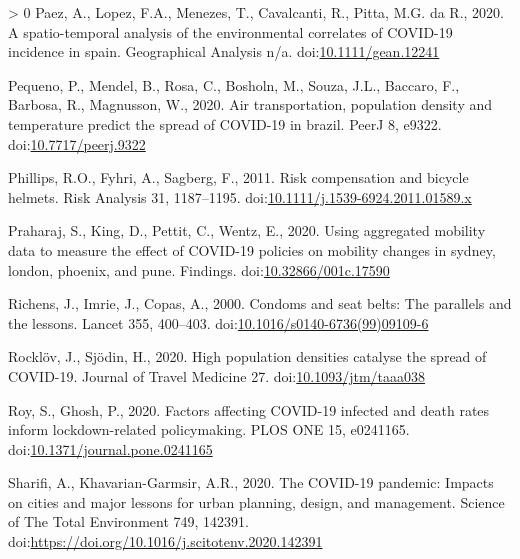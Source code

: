 \documentclass[]{elsarticle} %
\newlength{\cslhangindent}
\newenvironment{CSLReferences}[3] %
 {%
  \setlength{\parindent}{0pt}
  \ifodd #1 \everypar{\setlength{\hangindent}{\cslhangindent}}\ignorespaces\fi
  \ifnum #2 > 0
  \setlength{\parskip}{#2\baselineskip}
  \fi
 }%
 {}
\begin{document}
\begin{CSLReferences}{1}{0}
\leavevmode\hypertarget{ref-Paez2020spatio}{}%
Paez, A., Lopez, F.A., Menezes, T., Cavalcanti, R., Pitta, M.G. da R.,
2020. A spatio-temporal analysis of the environmental correlates of
COVID-19 incidence in spain. Geographical Analysis n/a.
doi:\href{https://doi.org/10.1111/gean.12241}{10.1111/gean.12241}

\leavevmode\hypertarget{ref-Pequeno2020air}{}%
Pequeno, P., Mendel, B., Rosa, C., Bosholn, M., Souza, J.L., Baccaro,
F., Barbosa, R., Magnusson, W., 2020. Air transportation, population
density and temperature predict the spread of COVID-19 in brazil. PeerJ
8, e9322.
doi:\href{https://doi.org/10.7717/peerj.9322}{10.7717/peerj.9322}

\leavevmode\hypertarget{ref-Phillips2011risk}{}%
Phillips, R.O., Fyhri, A., Sagberg, F., 2011. Risk compensation and
bicycle helmets. Risk Analysis 31, 1187--1195.
doi:\href{https://doi.org/10.1111/j.1539-6924.2011.01589.x}{10.1111/j.1539-6924.2011.01589.x}

\leavevmode\hypertarget{ref-Praharaj2020Using}{}%
Praharaj, S., King, D., Pettit, C., Wentz, E., 2020. Using aggregated
mobility data to measure the effect of COVID-19 policies on mobility
changes in sydney, london, phoenix, and pune. Findings.
doi:\href{https://doi.org/10.32866/001c.17590}{10.32866/001c.17590}

\leavevmode\hypertarget{ref-Richens2000condoms}{}%
Richens, J., Imrie, J., Copas, A., 2000. Condoms and seat belts: The
parallels and the lessons. Lancet 355, 400--403.
doi:\href{https://doi.org/10.1016/s0140-6736(99)09109-6}{10.1016/s0140-6736(99)09109-6}

\leavevmode\hypertarget{ref-Rocklov2020high}{}%
Rocklöv, J., Sjödin, H., 2020. High population densities catalyse the
spread of COVID-19. Journal of Travel Medicine 27.
doi:\href{https://doi.org/10.1093/jtm/taaa038}{10.1093/jtm/taaa038}

\leavevmode\hypertarget{ref-Roy2020factors}{}%
Roy, S., Ghosh, P., 2020. Factors affecting COVID-19 infected and death
rates inform lockdown-related policymaking. PLOS ONE 15, e0241165.
doi:\href{https://doi.org/10.1371/journal.pone.0241165}{10.1371/journal.pone.0241165}

\leavevmode\hypertarget{ref-Sharifi2020covid}{}%
Sharifi, A., Khavarian-Garmsir, A.R., 2020. The COVID-19 pandemic:
Impacts on cities and major lessons for urban planning, design, and
management. Science of The Total Environment 749, 142391.
doi:\url{https://doi.org/10.1016/j.scitotenv.2020.142391}


\end{CSLReferences}
\end{document}
